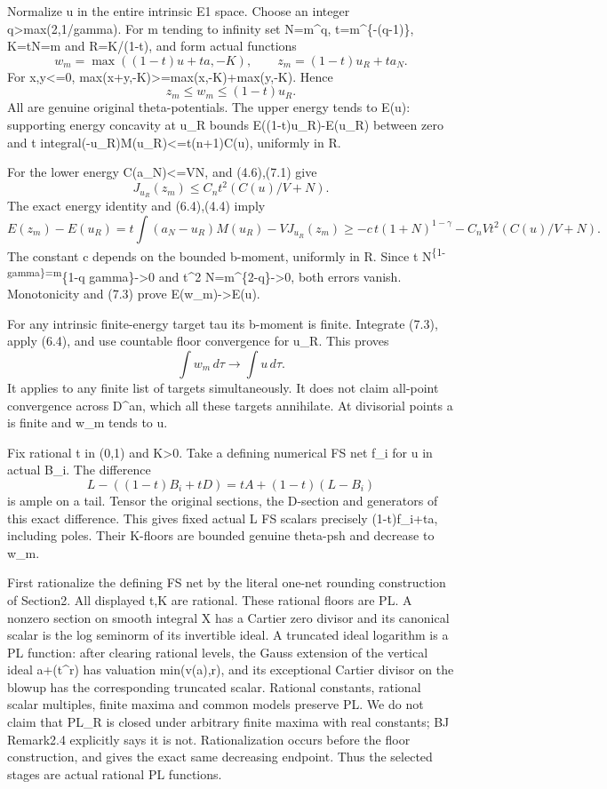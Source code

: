 \documentclass[
  10pt,
]{article}
\begin{document}
Normalize u in the entire intrinsic E1 space. Choose an integer
q\textgreater max(2,1/gamma). For m tending to infinity set N=m\^{}q,
t=m\^{}\{-(q-1)\}, K=tN=m and R=K/(1-t), and form actual functions \[
 w_m=\max((1-t)u+ta,-K),\qquad z_m=(1-t)u_R+t a_N.                       \tag{7.2}
\] For x,y\textless=0, max(x+y,-K)\textgreater=max(x,-K)+max(y,-K).
Hence \[
 z_m\le w_m\le(1-t)u_R.                                                \tag{7.3}
\] All are genuine original theta-potentials. The upper energy tends to
E(u): supporting energy concavity at u\_R bounds E((1-t)u\_R)-E(u\_R)
between zero and t integral(-u\_R)M(u\_R)\textless=t(n+1)C(u), uniformly
in R.

For the lower energy C(a\_N)\textless=VN, and (4.6),(7.1) give \[
 J_{u_R}(z_m)\le C_n t^2(C(u)/V+N).
\] The exact energy identity and (6.4),(4.4) imply \[
 E(z_m)-E(u_R)
 =t\int(a_N-u_R)M(u_R)-VJ_{u_R}(z_m)
 \ge-c\,t(1+N)^{1-\gamma}-C_n Vt^2(C(u)/V+N).                           \tag{7.4}
\] The constant c depends on the bounded b-moment, uniformly in R. Since
t N\textsuperscript{\{1-gamma\}=m}\{1-q gamma\}-\textgreater0 and t\^{}2
N=m\^{}\{2-q\}-\textgreater0, both errors vanish. Monotonicity and (7.3)
prove E(w\_m)-\textgreater E(u).

For any intrinsic finite-energy target tau its b-moment is finite.
Integrate (7.3), apply (6.4), and use countable floor convergence for
u\_R. This proves \[
 \int w_m\,d\tau\to\int u\,d\tau.                                      \tag{7.5}
\] It applies to any finite list of targets simultaneously. It does not
claim all-point convergence across D\^{}an, which all these targets
annihilate. At divisorial points a is finite and w\_m tends to u.

Fix rational t in (0,1) and K\textgreater0. Take a defining numerical FS
net f\_i for u in actual B\_i. The difference \[
 L-((1-t)B_i+tD)=tA+(1-t)(L-B_i)
\] is ample on a tail. Tensor the original sections, the D-section and
generators of this exact difference. This gives fixed actual L FS
scalars precisely (1-t)f\_i+ta, including poles. Their K-floors are
bounded genuine theta-psh and decrease to w\_m.

First rationalize the defining FS net by the literal one-net rounding
construction of Section2. All displayed t,K are rational. These rational
floors are PL. A nonzero section on smooth integral X has a Cartier zero
divisor and its canonical scalar is the log seminorm of its invertible
ideal. A truncated ideal logarithm is a PL function: after clearing
rational levels, the Gauss extension of the vertical ideal a+(t\^{}r)
has valuation min(v(a),r), and its exceptional Cartier divisor on the
blowup has the corresponding truncated scalar. Rational constants,
rational scalar multiples, finite maxima and common models preserve PL.
We do not claim that PL\_R is closed under arbitrary finite maxima with
real constants; BJ Remark2.4 explicitly says it is not. Rationalization
occurs before the floor construction, and gives the exact same
decreasing endpoint. Thus the selected stages are actual rational PL
functions.
\end{document}

